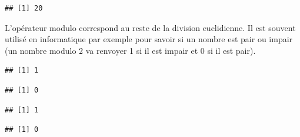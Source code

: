 \documentclass[twoside,symmetric]{book}
\newenvironment{Shaded}{}{}
\newcommand{\DecValTok}[1]{#1}
\newcommand{\NormalTok}[1]{#1}
\newcommand{\OperatorTok}[1]{#1}
\newcommand{\StringTok}[1]{#1}
\begin{document}
\begin{verbatim}
## [1] 20
\end{verbatim}

L'opérateur modulo correspond au reste de la division euclidienne. Il est souvent utilisé en informatique par exemple pour savoir si un nombre est pair ou impair (un nombre modulo 2 va renvoyer 1 si il est impair et 0 si il est pair).

\begin{Shaded}
\end{Shaded}

\begin{verbatim}
## [1] 1
\end{verbatim}

\begin{Shaded}
\end{Shaded}

\begin{verbatim}
## [1] 0
\end{verbatim}

\begin{Shaded}
\end{Shaded}

\begin{verbatim}
## [1] 1
\end{verbatim}

\begin{Shaded}
\end{Shaded}

\begin{verbatim}
## [1] 0
\end{verbatim}
\end{document}
